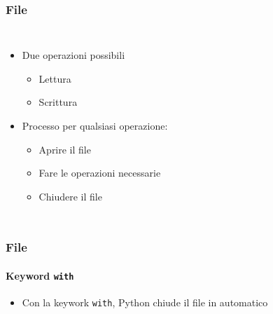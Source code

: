 

\begin{contentframe}
    \frametitle{File}

    \begin{columns}
        \begin{itemize}
            \item Due operazioni possibili
            \begin{itemize}
                \item Lettura
                \item Scrittura
            \end{itemize}
    
            \bigskip
            \item Processo per qualsiasi operazione:
            \begin{itemize}
                \item Aprire il file
                \item Fare le operazioni necessarie
                \item Chiudere il file
            \end{itemize}
        \end{itemize}
        
        \centering
    \end{columns}
\end{contentframe}

\begin{contentframe}
    \frametitle{File}
    \framesubtitle{Keyword \texttt{with}}

    \begin{itemize}
        \item Con la keywork \texttt{with}, Python chiude il file in automatico
    \end{itemize}

    \bigskip
    \begin{columns}
        
        \centering
    \end{columns}
\end{contentframe}

